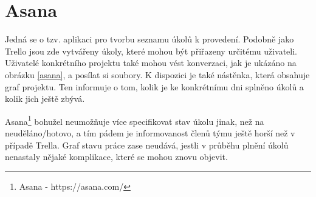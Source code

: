 \section{Asana}

Jedná se o tzv. aplikaci pro tvorbu seznamu úkolů k provedení. Podobně jako Trello jsou zde vytvářeny úkoly, které mohou být přiřazeny určitému uživateli. Uživatelé konkrétního projektu také mohou vést konverzaci, jak je ukázáno na obrázku \ref{asana}, a posílat si soubory. K dispozici je také nástěnka, která obsahuje graf projektu. Ten informuje o tom, kolik je ke konkrétnímu dni splněno úkolů a kolik jich ještě zbývá.

Asana\footnote{Asana - https://asana.com/} bohužel neumožňuje více specifikovat stav úkolu jinak, než na neuděláno/hotovo, a tím pádem je informovanost členů týmu ještě horší než v případě Trella. Graf stavu práce zase neudává, jestli v průběhu plnění úkolů nenastaly nějaké komplikace, které se mohou znovu objevit.


